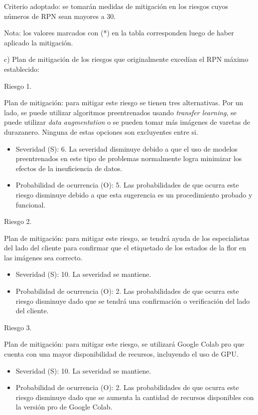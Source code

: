\documentclass[
11pt, %
]{charter}
\begin{document}
Criterio adoptado: 
se tomarán medidas de mitigación en los riesgos cuyos números de RPN sean mayores a 30.

Nota: los valores marcados con (*) en la tabla corresponden luego de haber aplicado la mitigación.

c) Plan de mitigación de los riesgos que originalmente excedían el RPN máximo establecido:

Riesgo 1. 

Plan de mitigación: para mitigar este riesgo se tienen tres alternativas. Por un lado, se puede utilizar algoritmos preentrenados usando \textit{transfer learning}, se puede utilizar \textit{data augmentation} o se pueden tomar más imágenes de varetas de durazanero. Ninguna de estas opciones son excluyentes entre si.

\begin{itemize}
\item Severidad (S): 6. La severidad disminuye debido a que el uso de modelos preentrenados en este tipo de problemas normalmente logra minimizar los efectos de la insuficiencia de datos.

\item Probabilidad de ocurrencia (O): 5. Las probabilidades de que ocurra este riesgo disminuye debido a que esta sugerencia es un procedimiento probado y funcional. 
\end{itemize}

Riesgo 2. 

Plan de mitigación: para mitigar este riesgo, se tendrá ayuda de los especialistas del lado del cliente para confirmar que el etiquetado de los estados de la flor en las imágenes sea correcto.

\begin{itemize}
\item Severidad (S): 10. La severidad se mantiene.

\item Probabilidad de ocurrencia (O): 2. Las probabilidades de que ocurra este riesgo disminuye dado que se tendrá una confirmación o verificación del lado del cliente. 
\end{itemize}

Riesgo 3. 

Plan de mitigación: para mitigar este riesgo, se utilizará Google Colab pro que cuenta con una mayor disponibilidad de recursos, incluyendo el uso de GPU.

\begin{itemize}
\item Severidad (S): 10. La severidad se mantiene.

\item Probabilidad de ocurrencia (O): 2. Las probabilidades de que ocurra este riesgo disminuye dado que se aumenta la cantidad de recursos disponibles con la versión pro de Google Colab. 
\end{itemize}
\end{document}
